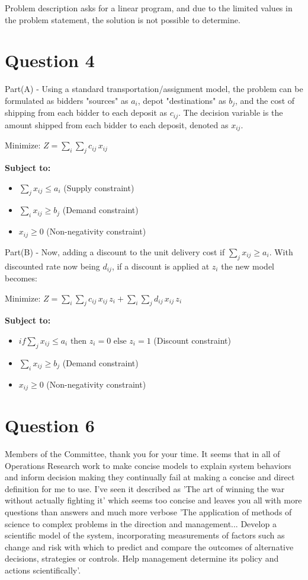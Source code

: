 \documentclass{article}
\begin{document}
Problem description asks for a linear program, and due to the limited values in the problem statement, the solution is not possible to determine.


\section*{Question 4}
Part(A) - Using a standard transportation/assignment model, the problem can be formulated as bidders "sources" as $a_i$, depot "destinations" as $b_j$, and the cost of shipping from each bidder to each deposit as $c_{ij}$. The decision variable is the amount shipped from each bidder to each deposit, denoted as $x_{ij}$.

Minimize: $Z = \sum_i \sum_j c_{ij} \, x_{ij}$

\textbf{Subject to:}
\begin{itemize}
    \item $\sum_j x_{ij} \le a_i$ (Supply constraint)
    \item $\sum_i x_{ij} \ge b_j$ (Demand constraint)
    \item \(x_{ij} \ge 0\) (Non-negativity constraint)
\end{itemize}

Part(B) - Now, adding a discount to the unit delivery cost if $\sum_j x_{ij} \ge a_i$. With discounted rate now being $d_{ij}$, if a discount is applied at $z_i$ the new model becomes:

Minimize: $Z = \sum_i \sum_j c_{ij} \, x_{ij} \, z_i + \sum_i \sum_j d_{ij} \, x_{ij} \, z_i$ 

\textbf{Subject to:}
\begin{itemize}
    \item $if \sum_j x_{ij} \le a_i \text{ then } z_i = 0 \text{ else } z_i = 1$ (Discount constraint)
    \item $\sum_i x_{ij} \ge b_j$ (Demand constraint)
    \item \(x_{ij} \ge 0\) (Non-negativity constraint)
\end{itemize}

\section*{Question 6}
Members of the Committee, thank you for your time. It seems that in all of Operations Research work to make concise models to explain system behaviors and inform decision making they continually fail at making a concise and direct definition for me to use. I've seen it described as 'The art of winning the war without actually fighting it' which seems too concise and leaves you all with more questions than answers and much more verbose 'The application of methods of science to complex problems in the direction and management... Develop a scientific model of the system, incorporating measurements of factors such as change and risk with which to predict and compare the outcomes of alternative decisions, strategies or controls. Help management determine its policy and actions scientifically'.
\end{document}
